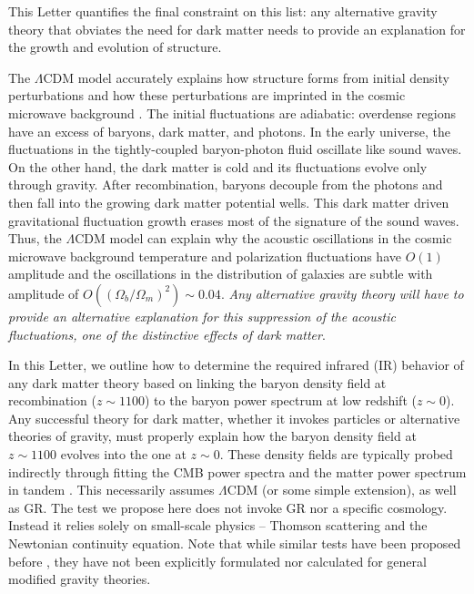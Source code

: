 \documentclass[12pt,floats,floatfix,showpacs,amssymb,amsmath,prl,superscriptaddress,nofootinbib, aps]{revtex4-2}
\begin{document}
This Letter quantifies the final constraint on this list: any alternative gravity theory that obviates the need for dark matter needs to provide an explanation for the growth and evolution of structure. 

The $\Lambda$CDM model accurately explains how structure forms from initial density perturbations and how these perturbations are imprinted in the cosmic microwave background \citep{Lifshitz1946, Peebles1970, Sunyaev1970b,Bond1984, Peebles1984}. The initial fluctuations are adiabatic: overdense regions have an excess of baryons, dark matter, and photons. In the early universe, the fluctuations in the tightly-coupled baryon-photon fluid oscillate like sound waves. On the other hand, the dark matter is cold and its fluctuations evolve only through gravity. After recombination, baryons decouple from the photons and then fall into the growing dark matter potential wells. This dark matter driven gravitational fluctuation growth erases most of the signature of the sound waves. Thus, the $\Lambda$CDM model can explain why the acoustic oscillations in the cosmic microwave background temperature and polarization fluctuations have $O(1)$ amplitude and the oscillations in the distribution of galaxies are subtle with amplitude of $O\left((\Omega_b/\Omega_m)^2\right) \sim 0.04$. {\it Any alternative gravity theory will have to provide an alternative explanation for this suppression of the acoustic fluctuations, one of the distinctive effects of dark matter}.

In this Letter, we outline how to determine the required infrared (IR) behavior of any dark matter theory based on linking the baryon density field at recombination ($z\sim1100$) to the baryon power spectrum at low redshift ($z\sim 0$). Any successful theory for dark matter, whether it invokes particles or alternative theories of gravity, must properly explain how the baryon density field at $z\sim 1100$ evolves into the one at $z\sim 0$. These density fields are typically probed indirectly through fitting the CMB power spectra and the matter power spectrum in tandem \citep[e.g.,][]{Spergel2003, Planck2018}. This necessarily assumes $\Lambda$CDM (or some simple extension), as well as GR. The test we propose here does not invoke GR nor a specific cosmology. Instead it relies solely on small-scale physics -- Thomson scattering and the Newtonian continuity equation. Note that while similar tests have been proposed before \citep{McGaugh2004, Dodelson2011}, they have not been explicitly formulated nor calculated for general modified gravity theories.
\end{document}
